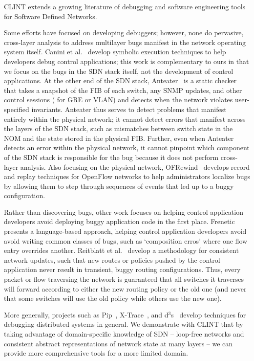 CLINT extends a growing literature of debugging and software engineering tools for Software Defined Networks.
    
Some efforts have focused on developing debuggers; however, none do pervasive, cross-layer analysis to address multilayer bugs manifest in the network operating system itself. 
Canini et al.~\cite{canini} develop symbolic execution techniques to help developers debug control applications; this work is complementary to ours in that we focus on the bugs in the SDN stack itself, not the development of control applications.   
At the other end of the SDN stack, Anteater~\cite{anteater} is a static checker that takes a snapshot of the FIB of each switch, any SNMP updates, and other control sessions (\eg{} for GRE or VLAN) and detects when the network violates user-specified invariants.
Anteater thus serves to detect problems that manifest entirely within the physical network; it cannot detect errors that manifest across the layers of the SDN stack, such as mismatches between switch state in the NOM and the state stored in the physical FIB.
Further, even when Anteater detects an error within the physical network, it cannot pinpoint which component of the SDN stack is responsible for the bug because it does not perform cross-layer analysis.
Also focusing on the physical network, OFRewind~\cite{ofrewind} develops record and replay techniques for OpenFlow networks to help administrators localize bugs by allowing them to step through sequences of events that led up to a buggy configuration.

Rather than  discovering bugs, other work focuses on helping control application developers avoid deploying buggy application code in the first place. 
Frenetic~\cite{frenetic} presents a language-based approach, helping control application developers avoid avoid writing common classes of bugs, such as `composition erros' where one flow entry overrides another.
Reitblatt et al.~\cite{consistentupdates}  develop a methodology for consistent network updates, such that new routes or policies pushed by the control application never result in transient, buggy routing configurations.
Thus, every packet or flow traversing the network is guaranteed that all switches it traverses will forward according to either the new routing policy or the old one (and never that some switches will use the old policy while others use the new one). 

More generally, projects such as Pip~\cite{pip}, X-Trace~\cite{xtrace}, and d$^3$s~\cite{d3s} develop techniques for debugging distributed systems in general.
We demonstrate with CLINT that by taking advantage of domain-specific knowledge of SDN -- \eg{} loop-free networks and consistent abstract representations of network state at many layers -- we can provide more comprehensive tools for a more limited domain. 
